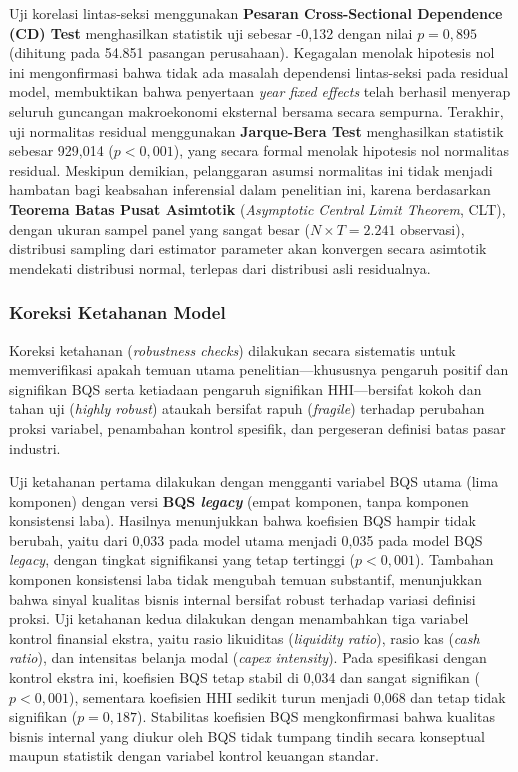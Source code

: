 \documentclass[12pt,a4paper]{article}
\begin{document}
Uji korelasi lintas-seksi menggunakan \textbf{Pesaran Cross-Sectional
Dependence (CD) Test} menghasilkan statistik uji sebesar -0,132 dengan
nilai \(p = 0{,}895\) (dihitung pada 54.851 pasangan perusahaan).
Kegagalan menolak hipotesis nol ini mengonfirmasi bahwa tidak ada
masalah dependensi lintas-seksi pada residual model, membuktikan bahwa
penyertaan \emph{year fixed effects} telah berhasil menyerap seluruh
guncangan makroekonomi eksternal bersama secara sempurna. Terakhir, uji
normalitas residual menggunakan \textbf{Jarque-Bera Test} menghasilkan
statistik sebesar 929,014 (\(p < 0{,}001\)), yang secara formal menolak
hipotesis nol normalitas residual. Meskipun demikian, pelanggaran asumsi
normalitas ini tidak menjadi hambatan bagi keabsahan inferensial dalam
penelitian ini, karena berdasarkan \textbf{Teorema Batas Pusat
Asimtotik} (\emph{Asymptotic Central Limit Theorem}, CLT), dengan ukuran
sampel panel yang sangat besar (\(N \times T = 2.241\) observasi),
distribusi sampling dari estimator parameter akan konvergen secara
asimtotik mendekati distribusi normal, terlepas dari distribusi asli
residualnya.

\subsubsection{Koreksi Ketahanan Model}\label{koreksi-ketahanan-model-1}

Koreksi ketahanan (\emph{robustness checks}) dilakukan secara sistematis
untuk memverifikasi apakah temuan utama penelitian---khususnya pengaruh
positif dan signifikan BQS serta ketiadaan pengaruh signifikan
HHI---bersifat kokoh dan tahan uji (\emph{highly robust}) ataukah
bersifat rapuh (\emph{fragile}) terhadap perubahan proksi variabel,
penambahan kontrol spesifik, dan pergeseran definisi batas pasar
industri.

Uji ketahanan pertama dilakukan dengan mengganti variabel BQS utama
(lima komponen) dengan versi \textbf{BQS \emph{legacy}} (empat komponen,
tanpa komponen konsistensi laba). Hasilnya menunjukkan bahwa koefisien
BQS hampir tidak berubah, yaitu dari 0,033 pada model utama menjadi
0,035 pada model BQS \emph{legacy}, dengan tingkat signifikansi yang
tetap tertinggi (\(p < 0{,}001\)). Tambahan komponen konsistensi laba
tidak mengubah temuan substantif, menunjukkan bahwa sinyal kualitas
bisnis internal bersifat robust terhadap variasi definisi proksi. Uji
ketahanan kedua dilakukan dengan menambahkan tiga variabel kontrol
finansial ekstra, yaitu rasio likuiditas (\emph{liquidity ratio}), rasio
kas (\emph{cash ratio}), dan intensitas belanja modal (\emph{capex
intensity}). Pada spesifikasi dengan kontrol ekstra ini, koefisien BQS
tetap stabil di 0,034 dan sangat signifikan (\(p < 0{,}001\)), sementara
koefisien HHI sedikit turun menjadi 0,068 dan tetap tidak signifikan
(\(p = 0{,}187\)). Stabilitas koefisien BQS mengkonfirmasi bahwa
kualitas bisnis internal yang diukur oleh BQS tidak tumpang tindih
secara konseptual maupun statistik dengan variabel kontrol keuangan
standar.
\end{document}
